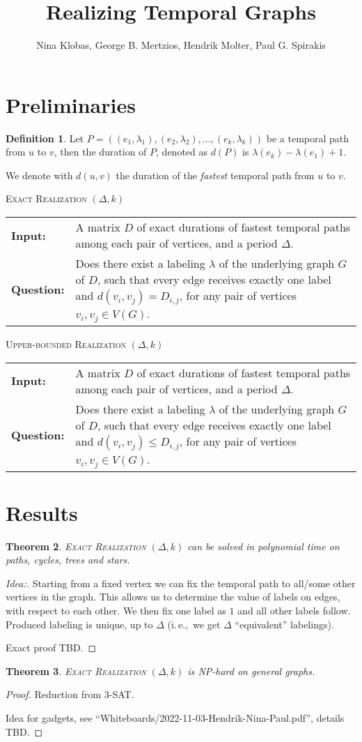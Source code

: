 \documentclass[11pt,a4paper]{article}
\title{Realizing Temporal Graphs}
\author{Nina Klobas, George B. Mertzios, Hendrik Molter, Paul G. Spirakis}
\makeatletter
\newtheorem{theorem}{Theorem}
\theoremstyle{remark}
\theoremstyle{definition}
\newtheorem{definition}[theorem]{Definition}
\newcommand{\ie}{i.\,e.,\ }
\newcommand{\NP}{\textrm{NP}}
\newcommand{\problemdef}[3]{
	\begin{center}
		\begin{minipage}{0.95\textwidth}
			\noindent
			#1
			\vspace{5pt}\\
			\setlength{\tabcolsep}{3pt}
			\begin{tabularx}{\textwidth}{@{}lX@{}}
				\textbf{Input:}& #2 \\
				\textbf{Question:}& #3
			\end{tabularx}
		\end{minipage}
	\end{center}
}
\makeatother
\begin{document}
	\maketitle

\section{Preliminaries}

\begin{definition}
	Let $P = ((e_1, \lambda_1), (e_2,\lambda_2), \dots , (e_k, \lambda_k))$ be a temporal path from $u$ to $v$, then the duration of $P$, denoted as $d(P)$ is $\lambda(e_k) - \lambda(e_1) + 1$.
\end{definition}

We denote with $d(u,v)$ the duration of the \emph{fastest} temporal path from $u$ to $v$.
	
	
\problemdef{\textsc{Exact Realization $(\Delta, k)$}}
{A matrix $D$ of exact durations of fastest temporal paths among each pair of vertices, and a period $\Delta$.}
{Does there exist a labeling $\lambda$ of the underlying graph $G$ of $D$, such that every edge receives exactly one label and $d(v_i,v_j) = D_{i,j}$, for any pair of vertices $v_i, v_j \in V(G)$.}

\problemdef{\textsc{Upper-bounded Realization $(\Delta, k)$}}
{A matrix $D$ of exact durations of fastest temporal paths among each pair of vertices, and a period $\Delta$.}
{Does there exist a labeling $\lambda$ of the underlying graph $G$ of $D$, such that every edge receives exactly one label and $d(v_i,v_j) \leq D_{i,j}$, for any pair of vertices $v_i, v_j \in V(G)$.}


\section{Results}

\begin{theorem}
	\textsc{Exact Realization $(\Delta, k)$} can be solved in polynomial time on paths, cycles, trees and stars.
\end{theorem}

\begin{proof}[Idea:]
	Starting from a fixed vertex we can fix the temporal path to all/some other vertices in the graph. This allows us to determine the value of labels on edges, with respect to each other.
	We then fix one label as $1$ and all other labels follow.
	Produced labeling is unique, up to $\Delta$ (\ie we get $\Delta$ ``equivalent'' labelings).
	
	Exact proof TBD.
\end{proof}

\begin{theorem}
	\textsc{Exact Realization $(\Delta, k)$} is \NP-hard on general graphs.
\end{theorem}

\begin{proof}
	Reduction from 3-SAT.
	
	Idea for gadgets, see ``Whiteboards/2022-11-03-Hendrik-Nina-Paul.pdf'', details TBD.
\end{proof}

%	
\end{document}
